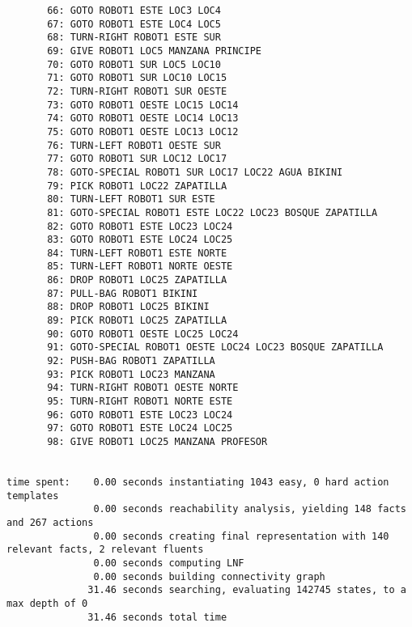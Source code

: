 \documentclass{article}
\begin{document}
\begin{lstlisting}
       66: GOTO ROBOT1 ESTE LOC3 LOC4
       67: GOTO ROBOT1 ESTE LOC4 LOC5
       68: TURN-RIGHT ROBOT1 ESTE SUR
       69: GIVE ROBOT1 LOC5 MANZANA PRINCIPE
       70: GOTO ROBOT1 SUR LOC5 LOC10
       71: GOTO ROBOT1 SUR LOC10 LOC15
       72: TURN-RIGHT ROBOT1 SUR OESTE
       73: GOTO ROBOT1 OESTE LOC15 LOC14
       74: GOTO ROBOT1 OESTE LOC14 LOC13
       75: GOTO ROBOT1 OESTE LOC13 LOC12
       76: TURN-LEFT ROBOT1 OESTE SUR
       77: GOTO ROBOT1 SUR LOC12 LOC17
       78: GOTO-SPECIAL ROBOT1 SUR LOC17 LOC22 AGUA BIKINI
       79: PICK ROBOT1 LOC22 ZAPATILLA
       80: TURN-LEFT ROBOT1 SUR ESTE
       81: GOTO-SPECIAL ROBOT1 ESTE LOC22 LOC23 BOSQUE ZAPATILLA
       82: GOTO ROBOT1 ESTE LOC23 LOC24
       83: GOTO ROBOT1 ESTE LOC24 LOC25
       84: TURN-LEFT ROBOT1 ESTE NORTE
       85: TURN-LEFT ROBOT1 NORTE OESTE
       86: DROP ROBOT1 LOC25 ZAPATILLA
       87: PULL-BAG ROBOT1 BIKINI
       88: DROP ROBOT1 LOC25 BIKINI
       89: PICK ROBOT1 LOC25 ZAPATILLA
       90: GOTO ROBOT1 OESTE LOC25 LOC24
       91: GOTO-SPECIAL ROBOT1 OESTE LOC24 LOC23 BOSQUE ZAPATILLA
       92: PUSH-BAG ROBOT1 ZAPATILLA
       93: PICK ROBOT1 LOC23 MANZANA
       94: TURN-RIGHT ROBOT1 OESTE NORTE
       95: TURN-RIGHT ROBOT1 NORTE ESTE
       96: GOTO ROBOT1 ESTE LOC23 LOC24
       97: GOTO ROBOT1 ESTE LOC24 LOC25
       98: GIVE ROBOT1 LOC25 MANZANA PROFESOR


time spent:    0.00 seconds instantiating 1043 easy, 0 hard action templates
               0.00 seconds reachability analysis, yielding 148 facts and 267 actions
               0.00 seconds creating final representation with 140 relevant facts, 2 relevant fluents
               0.00 seconds computing LNF
               0.00 seconds building connectivity graph
              31.46 seconds searching, evaluating 142745 states, to a max depth of 0
              31.46 seconds total time
\end{lstlisting}
\end{document}
